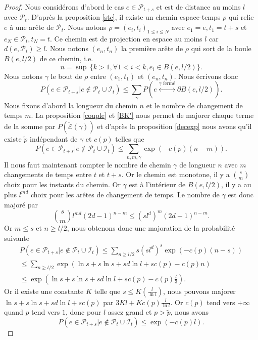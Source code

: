 \documentclass[titlepage,a4paper,12pt]{article}
\newcounter{prop}
\begin{document}
\begin{proof}
Nous considérons d'abord le cas $e\in \mathcal{P}_{t+s}$ et est de distance au moins $l$ avec $\mathcal{P}_t$.
D'après la proposition \ref{stc}, il existe un chemin espace-temps $\rho$ qui relie $e$ à une arête de $\mathcal{P}_t$. Nous notons $\rho= (e_i,t_i)_{1\leqslant i \leqslant N}$ avec $e_1 = e, t_1 = t+s$ et $e_N\in \mathcal{P}_t, t_N = t$. Ce chemin est de projection en espace au moins $l$ car $d(e,\mathcal{P}_t)\geqslant l$. Nous notons $(e_n,t_n)$ la première arête de $\rho$ qui sort de la boule $B(e,l/2)$ de ce chemin, i.e. 
$$ n = \sup\,\big\{k>1, \forall 1<i<k, e_i\in B(e,l/2) \big\}.
$$
Nous notons $\gamma$ le bout de $\rho$ entre $(e_1,t_1)$ et $(e_n,t_n)$.
Nous écrivons donc 
$$ P(e\in \mathcal{P}_{t+s}|e\notin \mathcal{P}_t\cup \mathcal{I}_t) \leqslant \sum_{\gamma}P( e\overset{\gamma \text{ fermé}}{\longleftrightarrow} \partial B(e,l/2)).
$$
Nous fixons d'abord la longueur du chemin $n$ et le nombre de changement de temps $m$. La proposition \ref{couple} et \ref{BK'} nous permet de majorer chaque terme de la somme par $P(\tilde{\mathcal{E}}(\gamma))$ et d'après la proposition \ref{decexp} nous avons qu'il existe $\tilde{p}$ indépendant de $\gamma$ et $c(p)$ telles que 
$$P(e\in \mathcal{P}_{t+s}|e\notin \mathcal{P}_t\cup \mathcal{I}_t) \leqslant \sum_{n,m,\gamma} \exp(-c(p)(n-m)).
$$
Il nous faut maintenant compter le nombre de chemin $\gamma$ de longueur $n$ avec $m$ changements de temps entre $t$ et $t+s$. Or le chemin est monotone, il y a $\displaystyle s \choose m$ choix pour les instants du chemin. Or $\gamma$ est à l'intérieur de $B(e,l/2)$, il y a au plus $l^{md}$ choix pour les arêtes de changement de temps. Le nombre de $\gamma$ est donc majoré par
$$ {s\choose m} l^{md} (2d-1)^{n-m}\leqslant (sl^d)^m(2d-1)^{n-m}.
$$
Or $m\leqslant s$ et $n\geqslant l/2$, nous obtenons donc une majoration de la probabilité suivante
\begin{multline*}P(e\in \mathcal{P}_{t+s}|e\notin \mathcal{P}_t\cup \mathcal{I}_t) \leqslant \sum_{n\geqslant l/2}s(sl^d)^s\exp(-c(p)(n-s))\\\leqslant \sum_{n\geqslant l/2} \exp(\ln s+s\ln s+sd\ln l +sc(p)-c(p)n)
\\ \leqslant \exp(\ln s+s\ln s+sd\ln l +sc(p) -c(p)\frac{l}{3}).
\end{multline*}
Or il existe une constante $K$ telle que $\displaystyle s \leqslant K(\frac{l}{\ln l})$, nous pouvons majorer $\ln s+s\ln s+sd\ln l +sc(p)$ par $\displaystyle 3Kl+Kc(p)\frac{l}{\ln l}$. Or $c(p)$ tend vers $+\infty$ quand $p$ tend vers $1$, donc pour $l$ assez grand et $p>\tilde{p}$, nous avons 
$$P(e\in \mathcal{P}_{t+s}|e\notin \mathcal{P}_t\cup \mathcal{I}_t) \leqslant \exp(-c(p)l).
$$


\end{proof}
\end{document}
